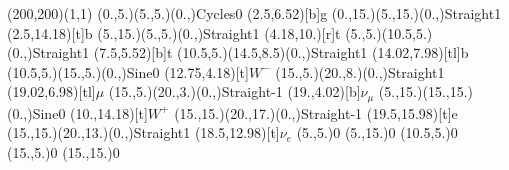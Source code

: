\documentclass[12pt]{article}
\begin{document}
 
 \thispagestyle{empty}
	
 \begin{feynartspicture}(200,200)(1,1) 
 \FADiagram{} 
\FAProp(0.,5.)(5.,5.)(0.,){Cycles}{0}
\FALabel(2.5,6.52)[b]{g}
\FAProp(0.,15.)(5.,15.)(0.,){Straight}{1}
\FALabel(2.5,14.18)[t]{b}
\FAProp(5.,15.)(5.,5.)(0.,){Straight}{1}
\FALabel(4.18,10.)[r]{t}
\FAProp(5.,5.)(10.5,5.)(0.,){Straight}{1}
\FALabel(7.5,5.52)[b]{t}
\FAProp(10.5,5.)(14.5,8.5)(0.,){Straight}{1}
\FALabel(14.02,7.98)[tl]{b}
\FAProp(10.5,5.)(15.,5.)(0.,){Sine}{0}
\FALabel(12.75,4.18)[t]{$W^-$}
\FAProp(15.,5.)(20.,8.)(0.,){Straight}{1}
\FALabel(19.02,6.98)[tl]{$\mu$}
\FAProp(15.,5.)(20.,3.)(0.,){Straight}{-1}
\FALabel(19.,4.02)[b]{$\nu_{\mu}$}
\FAProp(5.,15.)(15.,15.)(0.,){Sine}{0}
\FALabel(10.,14.18)[t]{$W^+$}
\FAProp(15.,15.)(20.,17.)(0.,){Straight}{-1}
\FALabel(19.5,15.98)[t]{e}
\FAProp(15.,15.)(20.,13.)(0.,){Straight}{1}
\FALabel(18.5,12.98)[t]{$\nu_e$}
\FAVert(5.,5.){0}
\FAVert(5.,15.){0}
\FAVert(10.5,5.){0}
\FAVert(15.,5.){0}
\FAVert(15.,15.){0}
 
	
 
 \end{feynartspicture} 
 
\end{document}
